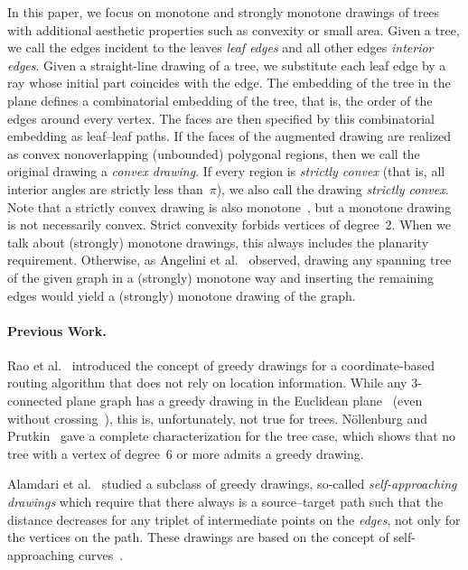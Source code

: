 \documentclass[a4paper,11pt]{article}
\theoremstyle{plain}
\begin{document}
In this paper, we focus on monotone and strongly monotone drawings of
trees with additional aesthetic properties such as convexity or small
area.  Given a tree, we call the 
edges incident to the leaves \emph{leaf edges} and all other edges
\emph{interior edges}.  Given a straight-line drawing of a tree, we
substitute each leaf edge by a ray whose initial part coincides with
the edge. The embedding of the tree in the plane defines a combinatorial embedding
of the tree, that is, the order of the edges around every vertex. The
faces are then specified by this combinatorial embedding as leaf--leaf paths. 
If the faces of the augmented drawing are realized as convex nonoverlapping
(unbounded) polygonal regions, then we call the original drawing a
\emph{convex drawing}.  If every region is \emph{strictly convex}
(that is, all interior angles are strictly less than~$\pi$), we also
call the drawing \emph{strictly convex}.  Note that a strictly convex
drawing is also monotone~\cite{acbfp-mdg-12,acm-mpaoa-SoCG89}, but a
monotone drawing is not necessarily convex.  Strict convexity forbids vertices 
of degree~2. When we talk about (strongly) monotone drawings, 
this always includes the planarity requirement.  Otherwise, as Angelini et
al.~\cite{acbfp-mdg-12} observed, drawing any spanning tree of the given
graph in a (strongly) monotone way and inserting the remaining edges
would yield a (strongly) monotone drawing of the graph.


\paragraph{Previous Work.}
Rao et al.~\cite{rpss-grwli-MOBICOM03} introduced the concept of 
greedy drawings for a coordinate-based routing algorithm that does not rely
on location information. While any 3-connected plane graph has a greedy drawing
in the Euclidean plane~\cite{lm-gems-10} (even without crossing~\cite{d-gdt-10}),
this is, unfortunately, not true for trees.  
N\"ollenburg and Prutkin~\cite{np-egdt-ESA13} gave a complete
characterization for the tree case, which shows that no tree with a
vertex of degree~6 or more admits a greedy drawing.  

Alamdari et al.~\cite{acglp-sag-GD12} studied a subclass of greedy drawings,
so-called \emph{self-approaching drawings} which require that there
always is a source--target path such that the distance decreases for
any triplet of intermediate points on the \emph{edges}, not only for
the vertices on the path.  These drawings are based on the concept of
self-approaching curves~\cite{ikl-sac-MPCPS95}. 
\end{document}
